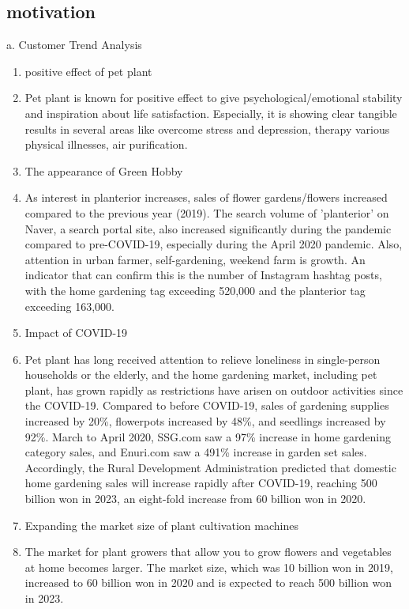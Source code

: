 \documentclass[conference, a4paper]{IEEEtran}
\begin{document}
\subsection{motivation}
a. Customer Trend Analysis
\begin{enumerate}
    \item positive effect of pet plant
    \item[] Pet plant is known for positive effect to give psychological/emotional stability and inspiration about life satisfaction. Especially, it is showing clear tangible results in several areas like overcome stress and depression, therapy various physical illnesses, air purification.\cite{ju2020}\\
    
    \item The appearance of Green Hobby
    \item[] As interest in planterior increases, sales of flower gardens/flowers increased compared to the previous year (2019). The search volume of 'planterior' on Naver, a search portal site, also increased significantly during the pandemic compared to pre-COVID-19, especially during the April 2020 pandemic. Also, attention in urban farmer, self-gardening, weekend farm is growth. An indicator that can confirm this is the number of Instagram hashtag posts, with the home gardening tag exceeding 520,000 and the planterior tag exceeding 163,000. \cite{hanaif_report} \\
    
    \item Impact of COVID-19
    \item[] Pet plant has long received attention to relieve loneliness in single-person households or the elderly, and the home gardening market, including pet plant, has grown rapidly as restrictions have arisen on outdoor activities since the COVID-19.
Compared to before COVID-19, sales of gardening supplies increased by 20\%, flowerpots increased by 48\%, and seedlings increased by 92\%. March to April 2020, SSG.com saw a 97\% increase in home gardening category sales, and Enuri.com saw a 491\% increase in garden set sales.
Accordingly, the Rural Development Administration predicted that domestic home gardening sales will increase rapidly after COVID-19, reaching 500 billion won in 2023, an eight-fold increase from 60 billion won in 2020. \cite{ajunews_article} \\

\item Expanding the market size of plant cultivation machines
\item[] The market for plant growers that allow you to grow flowers and vegetables at home becomes larger. The market size, which was 10 billion won in 2019, increased to 60 billion won in 2020 and is expected to reach 500 billion won in 2023. \cite{spcmagazine_article}
\\


\end{enumerate}
\end{document}
